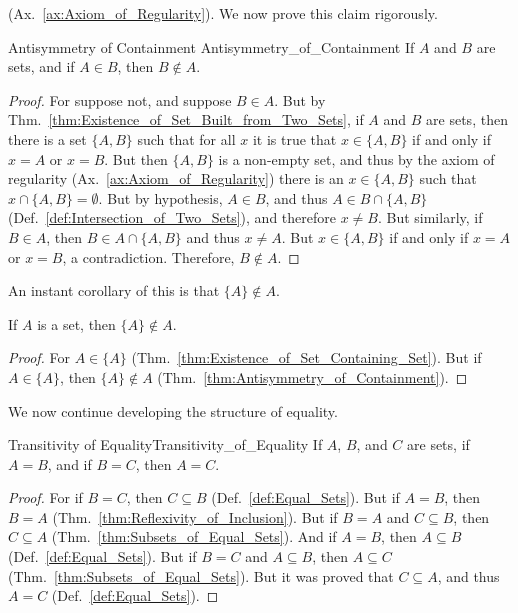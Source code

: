         (Ax.~\ref{ax:Axiom_of_Regularity}). We now prove this claim rigorously.
        \begin{ltheorem}{Antisymmetry of Containment}
                        {Antisymmetry_of_Containment}
            If $A$ and $B$ are sets, and if $A\in{B}$, then $B\notin{A}$.
        \end{ltheorem}
        \begin{proof}
            For suppose not, and suppose $B\in{A}$. But by
            Thm.~\ref{thm:Existence_of_Set_Built_from_Two_Sets}, if $A$ and $B$
            are sets, then there is a set $\{A,B\}$ such that for all $x$ it is
            true that $x\in\{A,B\}$ if and only if $x=A$ or $x=B$. But then
            $\{A,B\}$ is a non-empty set, and thus by the axiom of regularity
            (Ax.~\ref{ax:Axiom_of_Regularity}) there is an $x\in\{A,B\}$ such
            that $x\cap\{A,B\}=\emptyset$. But by hypothesis, $A\in{B}$, and
            thus $A\in{B}\cap\{A,B\}$ (Def.~\ref{def:Intersection_of_Two_Sets}),
            and therefore $x\ne{B}$. But similarly, if $B\in{A}$, then
            $B\in{A}\cap\{A,B\}$ and thus $x\ne{A}$. But $x\in\{A,B\}$ if and
            only if $x=A$ or $x=B$, a contradiction. Therefore, $B\notin{A}$.
        \end{proof}
        An instant corollary of this is that $\{A\}\notin{A}$.
        \begin{theorem}
            \label{thm:Set_Containing_A_is_not_Element_of_A}%
            If $A$ is a set, then $\{A\}\notin{A}$.
        \end{theorem}
        \begin{proof}
            For $A\in\{A\}$ (Thm.~\ref{thm:Existence_of_Set_Containing_Set}).
            But if $A\in\{A\}$, then $\{A\}\notin{A}$
            (Thm.~\ref{thm:Antisymmetry_of_Containment}).
        \end{proof}
        We now continue developing the structure of equality.
        \begin{ltheorem}{Transitivity of Equality}{Transitivity_of_Equality}
            If $A$, $B$, and $C$ are sets, if $A=B$, and if $B=C$, then $A=C$.
        \end{ltheorem}
        \begin{proof}
            For if $B=C$, then $C\subseteq{B}$ (Def.~\ref{def:Equal_Sets}). But
            if $A=B$, then $B=A$ (Thm.~\ref{thm:Reflexivity_of_Inclusion}). But
            if $B=A$ and $C\subseteq{B}$, then $C\subseteq{A}$
            (Thm.~\ref{thm:Subsets_of_Equal_Sets}). And if $A=B$, then
            $A\subseteq{B}$ (Def.~\ref{def:Equal_Sets}). But if $B=C$ and
            $A\subseteq{B}$, then $A\subseteq{C}$
            (Thm.~\ref{thm:Subsets_of_Equal_Sets}). But it was proved that
            $C\subseteq{A}$, and thus $A=C$ (Def.~\ref{def:Equal_Sets}).
        \end{proof}
